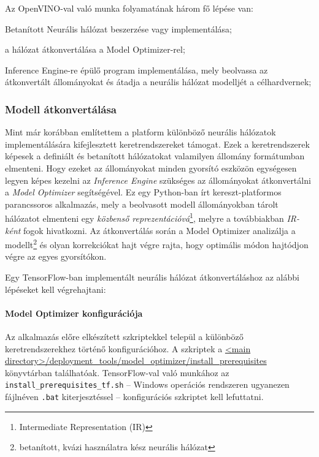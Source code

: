 Az OpenVINO-val való munka folyamatának három fő lépése van:
\begin{enumerate*}[label={}, font=\bfseries]
	\item Betanított Neurális hálózat beszerzése vagy implementálása;
	\item a hálózat átkonvertálása a Model Optimizer-rel;
	\item Inference Engine-re épülő program implementálása, mely beolvassa az átkonvertált állományokat és átadja a neurális hálózat modelljét a célhardvernek;
\end{enumerate*}

\subsubsection{Modell átkonvertálása}
Mint már korábban említettem a platform különböző neurális hálózatok implementálására kifejlesztett keretrendszereket támogat. Ezek a keretrendszerek képesek a definiált és betanított hálózatokat valamilyen állomány formátumban elmenteni. Hogy ezeket az állományokat minden gyorsító eszközön egységesen legyen képes kezelni az \emph{Inference Engine} szükséges az állományokat átkonvertálni a \emph{Model Optimizer} segítségével. Ez egy Python-ban írt kereszt-platformos parancssoros alkalmazás, mely a beolvasott modell állományokban tárolt hálózatot elmenteni egy \emph{közbenső reprezentációvá}\footnote{Intermediate Representation (IR)}, melyre a továbbiakban \emph{IR-ként} fogok hivatkozni. Az átkonvertálás során a Model Optimizer analizálja a modellt\footnote{betanított, kvázi használatra kész neurális hálózat} és olyan korrekciókat hajt végre rajta, hogy optimális módon hajtódjon végre az egyes gyorsítókon. 

Egy TensorFlow-ban implementált neurális hálózat átkonvertáláshoz az alábbi lépéseket kell végrehajtani:
\paragraph*{Model Optimizer konfigurációja}
	Az alkalmazás előre elkészített szkriptekkel települ a különböző keretrendszerekhez történő konfigurációhoz. A szkriptek a \url{<main directory>/deployment_tools/model_optimizer/install_prerequisites} könyvtárban találhatóak. TensorFlow-val való munkához az \verb|install_prerequisites_tf.sh| -- Windows operációs rendszeren ugyanezen fájlnéven \verb|.bat| kiterjesztéssel -- konfigurációs szkriptet kell lefuttatni.

